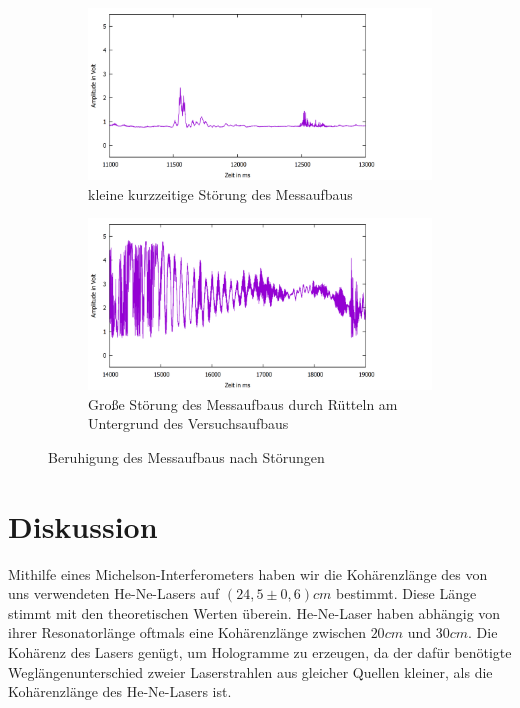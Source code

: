 \documentclass[12pt,a4paper]{article}
\begin{document}
\begin{figure}[h]
	\centering
	\begin{subfigure}{0.8\textwidth}
		\centering
		\includegraphics[width=\textwidth]{abklingzeit1.png}
		\caption{kleine kurzzeitige Störung des Messaufbaus}
		\label{bea}
	\end{subfigure}
	\begin{subfigure}{0.8\textwidth}
		\centering
		\includegraphics[width=\textwidth]{abklingzeit2.png}
		\caption{Große Störung des Messaufbaus durch Rütteln am Untergrund des Versuchsaufbaus}
		\label{beb}
	\end{subfigure}
	
	\caption{Beruhigung des Messaufbaus nach Störungen}
	\label{be1}
\end{figure}

\section{Diskussion}

Mithilfe eines Michelson-Interferometers haben wir die Kohärenzlänge des von uns verwendeten He-Ne-Lasers auf $(24,5 \pm 0,6)cm$ bestimmt. Diese Länge stimmt mit den theoretischen Werten überein. He-Ne-Laser haben abhängig von ihrer Resonatorlänge oftmals eine Kohärenzlänge zwischen $20cm$ und $30cm$. Die Kohärenz des Lasers genügt, um Hologramme zu erzeugen, da der dafür benötigte Weglängenunterschied zweier Laserstrahlen aus gleicher Quellen kleiner, als die Kohärenzlänge des He-Ne-Lasers ist.
\end{document}
